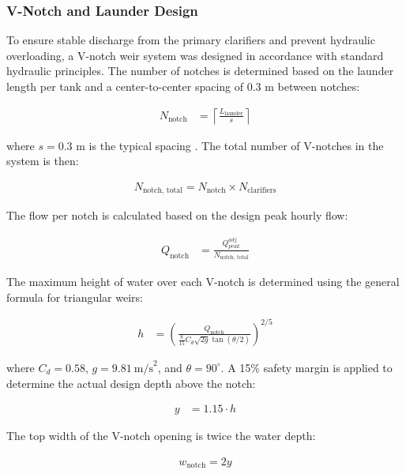 \documentclass[11pt]{article}
\begin{document}
\subsubsection{V-Notch and Launder Design}
\label{sec:vnotch_design}

To ensure stable discharge from the primary clarifiers 
and prevent hydraulic overloading, a V-notch weir system 
was designed in accordance with standard hydraulic principles. 
The number of notches is determined based on the launder length
per tank and a center-to-center spacing of 0.3 m between notches:

\begin{align}
N_{\text{notch}} &= \left\lceil \frac{L_{\text{launder}}}{s} \right\rceil
\end{align}

where \( s = 0.3 \) m is the typical spacing \cite{metcalf_2014_wastewater}. 
The total number of V-notches in the system is then:

\begin{align}
N_{\text{notch, total}} = N_{\text{notch}} \times N_{\text{clarifiers}}
\end{align}

The flow per notch is calculated based on the design peak hourly flow:

\begin{align}
Q_{\text{notch}} &= \frac{Q_{peak}^{adj}}{N_{\text{notch, total}}}
\end{align}

The maximum height of water over each V-notch is determined using the general formula for triangular weirs:

\begin{align}
h &= \left( \frac{Q_{\text{notch}}}{\frac{8}{15} C_d \sqrt{2g} \tan(\theta/2)} \right)^{2/5}
\label{eq:vnotch_height}
\end{align}

where \( C_d = 0.58 \), \( g = 9.81~\text{m/s}^2 \), and \( \theta = 90^\circ \). A 15\% safety margin is applied to determine the actual design depth above the notch:

\begin{align}
y &= 1.15 \cdot h
\end{align}

The top width of the V-notch opening is twice the water depth:

\begin{align}
w_{\text{notch}} = 2y
\end{align}
\end{document}
